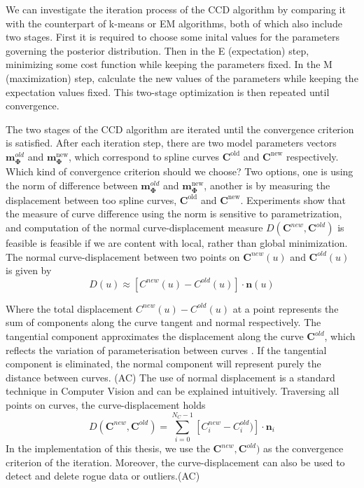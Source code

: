 We can investigate the iteration process of  the CCD algorithm by
comparing it with the counterpart of k-means or EM algorithms, both of
which also include two stages. First it is required to choose some
inital values for the parameters governing the posterior
distribution. Then in the E (expectation) step, minimizing some cost
function while keeping the parameters fixed. In the M (maximization)
step, calculate the new values of the parameters while keeping the
expectation values fixed. This two-stage optimization is then repeated
until convergence. 


The two stages of the CCD algorithm are iterated until the convergence
criterion is satisfied. After each iteration step, there are two
model parameters vectors $\mathbf{m}_{\mathbf{\Phi}}^{old}$ and
$\mathbf{m}_{\mathbf{\Phi}}^{\mathrm{new}}$, which correspond to
spline curves $\mathbf{C}^{\mathrm{old}}$ and
$\mathbf{C}^{\mathrm{new}}$ respectively. Which kind of convergence
criterion should we choose? Two options, one is using the norm of
difference between $\mathbf{m}_{\mathbf{\Phi}}^{old}$ and
$\mathbf{m}_{\mathbf{\Phi}}^{\mathrm{new}}$, another is by measuring
the displacement between too spline curves, $\mathbf{C}^{\mathrm{old}}$ and
$\mathbf{C}^{\mathrm{new}}$. Experiments show that the measure of
curve difference using the norm is sensitive to parametrization, and
computation of the normal curve-displacement measure $D(\mathbf{C}^{new},
\mathbf{C}^{old})$  is feasible is feasible if we are content with
local, rather than global minimization. The normal curve-displacement
between two points on $\mathbf{C}^{new}(u)$ and $\mathbf{C}^{old}(u)$ is given by 
\begin{equation}
  \label{eq:normald}
  D(u) \approx
  [C^{new}(u) - C^{old}(u)] \cdot \mathbf{n}(u)
\end{equation}

Where the total displacement $C^{new}(u) - C^{old}(u)$
 at a point represents the sum of components along
the curve tangent and normal respectively. The tangential component
approximates the displacement along the curve
$\mathbf{C}^{old}$, which reflects the variation of parameterisation
between curves . If the tangential component is eliminated, the normal
component will represent purely the distance between curves. (AC) The
use of normal displacement is a standard technique in Computer Vision
and can be explained intuitively. 
Traversing all points on curves, the curve-displacement holds
\begin{equation}
  \label{eq:bigD}
  D(\mathbf{C}^{new}, \mathbf{C}^{old})  = \sum_{i=0}^{N_{C}-1} [C_{i}^{new} - C_{i}^{old})] \cdot \mathbf{n}_{i}
\end{equation}
In the implementation of this thesis, we use the $\mathbf{C}^{new},
\mathbf{C}^{old})$ as the convergence criterion of the
iteration. Moreover, the curve-displacement can also be used to detect
and delete rogue data or outliers.(AC)

